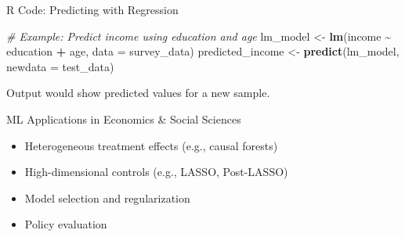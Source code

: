 \documentclass[
  ignorenonframetext,
]{beamer}
\newenvironment{Shaded}{\begin{snugshade}}{\end{snugshade}}
\newcommand{\AttributeTok}[1]{\textcolor[rgb]{0.13,0.29,0.53}{#1}}
\newcommand{\CommentTok}[1]{\textcolor[rgb]{0.56,0.35,0.01}{\textit{#1}}}
\newcommand{\DecValTok}[1]{\textcolor[rgb]{0.00,0.00,0.81}{#1}}
\newcommand{\FunctionTok}[1]{\textcolor[rgb]{0.13,0.29,0.53}{\textbf{#1}}}
\newcommand{\NormalTok}[1]{#1}
\newcommand{\OtherTok}[1]{\textcolor[rgb]{0.56,0.35,0.01}{#1}}
\newcommand{\SpecialCharTok}[1]{\textcolor[rgb]{0.81,0.36,0.00}{\textbf{#1}}}
\providecommand{\tightlist}{%
  \setlength{\itemsep}{0pt}\setlength{\parskip}{0pt}}
\begin{document}
\begin{frame}[fragile]{R Code: Predicting with Regression}
\protect\hypertarget{r-code-predicting-with-regression}{}
\begin{Shaded}
\begin{Highlighting}[]
\CommentTok{\# Example: Predict income using education and age}
\NormalTok{lm\_model }\OtherTok{\textless{}{-}} \FunctionTok{lm}\NormalTok{(income }\SpecialCharTok{\textasciitilde{}}\NormalTok{ education }\SpecialCharTok{+}\NormalTok{ age, }\AttributeTok{data =}\NormalTok{ survey\_data)}
\NormalTok{predicted\_income }\OtherTok{\textless{}{-}} \FunctionTok{predict}\NormalTok{(lm\_model, }\AttributeTok{newdata =}\NormalTok{ test\_data)}
\end{Highlighting}
\end{Shaded}

Output would show predicted values for a new sample.

\end{frame}

\begin{frame}[fragile]{ML Applications in Economics \& Social Sciences}
\protect\hypertarget{ml-applications-in-economics-social-sciences}{}
\begin{itemize}
\tightlist
\item
  Heterogeneous treatment effects (e.g., causal forests)
\item
  High-dimensional controls (e.g., LASSO, Post-LASSO)
\item
  Model selection and regularization
\item
  Policy evaluation
\end{itemize}

\begin{Shaded}
\end{Shaded}

\end{frame}
\end{document}
